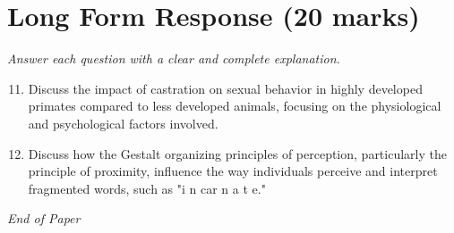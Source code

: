 \documentclass[12pt]{article}
\begin{document}
\section*{Long Form Response (20 marks)}
\textit{Answer each question with a clear and complete explanation.}
\begin{enumerate}[label=\arabic*.]
\setcounter{enumi}{10}
\item Discuss the impact of castration on sexual behavior in highly developed primates compared to less developed animals, focusing on the physiological and psychological factors involved.
\item Discuss how the Gestalt organizing principles of perception, particularly the principle of proximity, influence the way individuals perceive and interpret fragmented words, such as "i n car n a t e."
\end{enumerate}

\vfill
\noindent\textit{End of Paper}
\end{document}
